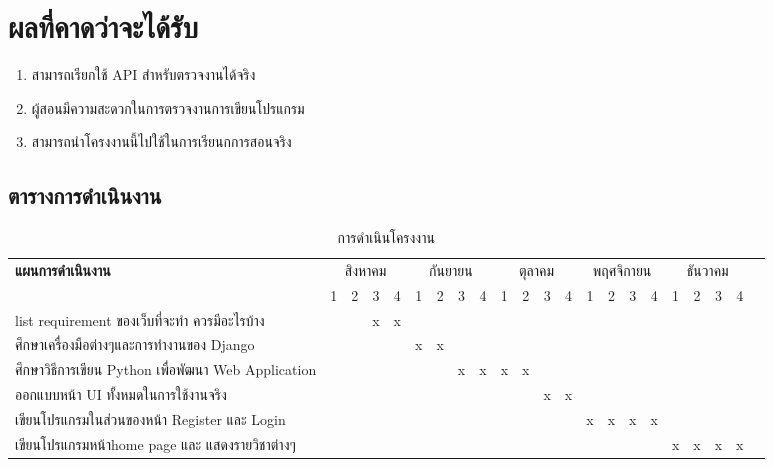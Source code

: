 \section{ผลที่คาดว่าจะได้รับ}
\begin{enumerate}
    \item สามารถเรียกใช้ API สำหรับตรวจงานได้จริง
    \item ผู้สอนมีความสะดวกในการตรวจงานการเขียนโปรแกรม
    \item สามารถนำโครงงานนี้ไปใช้ในการเรียนกการสอนจริง
\end{enumerate}

\begin{landscape}
\section{ตารางการดำเนินงาน}
\begin{table}[h!]
 \centering
 \begin{threeparttable}
  \begin{tabular}{|l|c|c|c|c|c|c|c|c|c|c|c|c|c|c|c|c|c|c|c|c|c|}
  
    \hline
    \multirow{2}{*}{\textbf{แผนการดำเนินงาน}}
    & \multicolumn{4}{c|}{สิงหาคม} 
    & \multicolumn{4}{c|}{กันยายน} 
    & \multicolumn{4}{c|}{ตุลาคม}
    & \multicolumn{4}{c|}{พฤศจิกายน}
    & \multicolumn{4}{c|}{ธันวาคม}\\
    \cline{2-21}
    & 1 & 2 & 3 & 4
    & 1 & 2 & 3 & 4
    & 1 & 2 & 3 & 4
    & 1 & 2 & 3 & 4
    & 1 & 2 & 3 & 4\\
    \hline
    
    
    list requirement ของเว็บที่จะทำ ควรมีอะไรบ้าง &&&x&x&&&&&&&&&&&&&&&&\\
     \hline
    ศึกษาเครื่องมือต่างๆและการทำงานของ Django &&&&&x&x&&&&&&&&&&&&&&\\
    \hline
    ศึกษาวิธีการเขียน Python เพื่อพัฒนา Web Application &&&&&&&x&x&x&x&&&&&&&&&&\\
    \hline
    ออกแบบหน้า UI ทั้งหมดในการใช้งานจริง &&&&&&&&&&&x&x&&&&&&&&\\
    \hline
    เขียนโปรแกรมในส่วนของหน้า Register และ Login &&&&&&&&&&&&&x&x&x&x&&&&\\
    \hline
    เขียนโปรแกรมหน้าhome page และ แสดงรายวิชาต่างๆ &&&&&&&&&&&&&&&&&x&x&x&x\\
    \hline
    
  \end{tabular}
  \caption{การดำเนินโครงงาน}
  \label{table:table}
  \end{threeparttable}
\end{table}
\begin{table}[h!]
 \centering
 \begin{threeparttable}
  \begin{tabular}{|l|c|c|c|c|c|c|c|c|c|c|c|c|c|c|c|c|c|c|c|c|c|}
  

\end{tabular}
\end{threeparttable}
\end{table}
\end{landscape}
